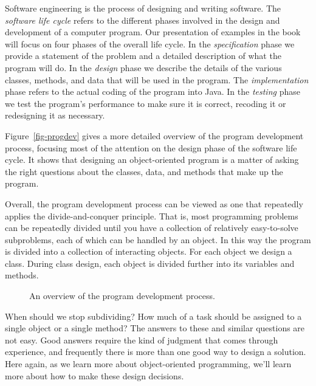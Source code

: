 \noindent Software engineering is the process of designing
and writing software.  The {\it software life cycle} refers to the
different phases involved in the design and development of a computer
program.  Our presentation of examples in the book will focus on four
phases of the overall life cycle. In the {\em specification} phase we
provide a statement of the problem and a detailed description of what
the program will do. In the {\em design} phase we describe the details
of the various classes, methods, and data that will be used in the
program. The {\em implementation} phase refers to the actual coding of
the program into Java.  In the {\em testing} phase we test the
program's performance to make sure it is correct, recoding it or
redesigning it as necessary.

Figure~\ref{fig-progdev} gives a more detailed overview of the program
development process, focusing most of the attention on the design
phase of the software life cycle. It shows that designing an
object-oriented program is a matter of asking the right questions
about the classes, data, and methods that make up the program. 

Overall, the program development process can be viewed as one that
repeatedly applies the divide-and-conquer principle.  That is, most
programming problems can be repeatedly divided until you have a
collection of relatively easy-to-solve subproblems, each of which can
be handled by an object. In this way the program is
divided into a collection of interacting objects. For each object we
design a class. During class design, each object is divided further
into its variables and methods.

\begin{figure}[h]
%
{An overview of the program development process.
\label{fig-progdev}
\label{pg-fig-progdev}}
\end{figure}

When should we stop subdividing? How much of a task should be assigned
to a single object or a single method?  The answers to these and
similar questions are not easy.  Good answers require the kind of 
judgment that comes through experience, and frequently there is more
than one good way to design a solution.  Here again, as we learn more
about object-oriented programming, we'll learn more about how to make
these design decisions.

